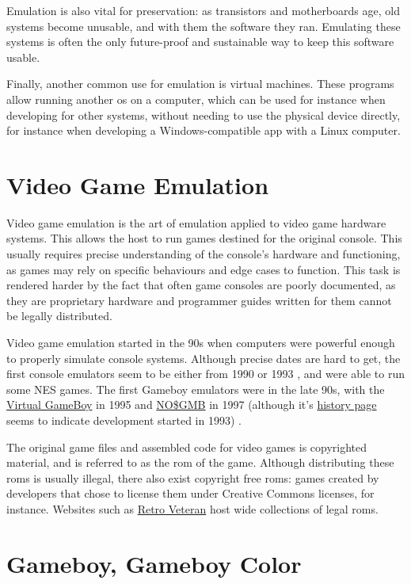 \documentclass[11pt]{report}
\begin{document}
Emulation is also vital for preservation: as transistors and motherboards age, old systems become unusable, and with them the software they ran. Emulating these systems is often the only future-proof and sustainable way to keep this software usable.

Finally, another common use for emulation is virtual machines. These programs allow running another \gls{os} on a computer, which can be used for instance when developing for other systems, without needing to use the physical device directly, for instance when developing a Windows-compatible app with a Linux computer.

\section{Video Game Emulation}

Video game emulation is the art of emulation applied to video game hardware systems. This allows the host to run games destined for the original console. This usually requires precise understanding of the console's hardware and functioning, as games may rely on specific behaviours and edge cases to function. This task is rendered harder by the fact that often game consoles are poorly documented, as they are proprietary hardware and programmer guides written for them cannot be legally distributed.

Video game emulation started in the 90s when computers were powerful enough to properly simulate console systems. Although precise dates are hard to get, the first console emulators seem to be either from 1990 or 1993 \cite{first_nes_emu}, and were able to run some NES games. The first Gameboy emulators were in the late 90s, with the \href{http://fms.komkon.org/VGB/}{Virtual GameBoy} in 1995 and \href{https://problemkaputt.de/gmb.htm}{NO\$GMB} in 1997 (although it's \href{https://problemkaputt.de/gmbhist.htm}{history page} seems to indicate development started in 1993) \cite{first_gb_emus}.

The original game files and assembled code for video games is copyrighted material, and is referred to as the \gls{rom} of the game. Although distributing these \glspl{rom} is usually illegal, there also exist copyright free \glspl{rom}: games created by developers that chose to license them under Creative Commons licenses, for instance. Websites such as \href{https://www.retroveteran.com/category/nintendo-game-boy-color/}{Retro Veteran} host wide collections of legal \glspl{rom}.

\section{Gameboy, Gameboy Color}
\end{document}
